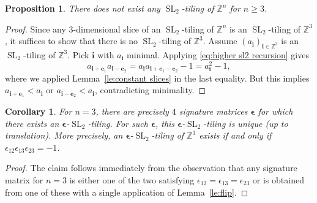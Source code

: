 \documentclass[12pt]{amsart}
\newtheorem{corollary}[theorem]{Corollary}
\newtheorem{proposition}[theorem]{Proposition}
\newcommand{\bepsilon}{\boldsymbol{\epsilon}}
\newcommand{\be}{\boldsymbol{e}}
\newcommand{\bi}{\boldsymbol{i}}
\newcommand{\SL}{\operatorname{SL}}
\newcommand{\ZZ}{\mathbb{Z}}
\begin{document}
  \begin{proposition}\label{pr:nonexistence}
    There does not exist any $\SL_2$-tiling of $\ZZ^n$ for $n\geq3$.
  \end{proposition}
  \begin{proof}
    Since any $3$-dimensional slice of an $\SL_2$-tiling of $\ZZ^n$ is an $\SL_2$-tiling of $\ZZ^3$, it suffices to show that there is no $\SL_2$-tiling of $\ZZ^3$.
    Assume $(a_{\bi})_{\bi\in\ZZ^3}$ is an $\SL_2$-tiling of $\ZZ^3$.
    Pick $\bi$ with $a_{\bi}$ minimal.
    Applying \eqref{eq:higher sl2 recursion} gives
    \[
      a_{\bi+\be_1}a_{\bi-\be_2}=a_{\bi}a_{\bi+\be_1-\be_2}-1=a_{\bi}^2-1,
    \]
    where we applied Lemma~\ref{le:constant slices} in the last equality.
    But this implies $a_{\bi+\be_1}<a_{\bi}$ or $a_{\bi-\be_2}<a_{\bi}$, contradicting minimality.
  \end{proof}

  \begin{corollary}\label{co:n=3}
    For $n=3$, there are precisely $4$ signature matrices $\bepsilon$ for which there exists an $\bepsilon$-$\SL_2$-tiling.
    For such $\bepsilon$, this $\bepsilon$-$\SL_2$-tiling is unique (up to translation).
    More precisely, an $\bepsilon$-$\SL_2$-tiling of $\ZZ^3$ exists if and only if $\epsilon_{12}\epsilon_{13}\epsilon_{23}=-1$.
  \end{corollary}
  \begin{proof}
    The claim follows immediately from the observation that any signature matrix for $n=3$ is either one of the two satisfying $\epsilon_{12}=\epsilon_{13}=\epsilon_{23}$ or is obtained from one of these with a single application of Lemma~\ref{le:flip}.
  \end{proof}
\end{document}
